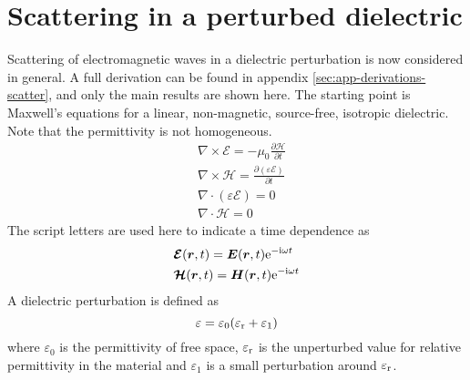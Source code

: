 \documentclass[11pt,twoside]{eitExjobb}
\begin{document}
	\section{Scattering in a perturbed dielectric \label{sec:analytical-scatter}}
	Scattering of electromagnetic waves in a dielectric perturbation is now considered in general. A full derivation can be found in appendix \ref{sec:app-derivations-scatter}, and only the main results are shown here. The starting point is Maxwell's equations for a linear, non-magnetic, source-free, isotropic dielectric. Note that the permittivity is not homogeneous.
	\begin{align*}
		&\nabla \times \bm{\mathcal{E}} = -\mu_0 \frac{\partial \bm{\mathcal{H}}}{\partial t} \\
		&\nabla \times \bm{\mathcal{H}} = \frac{\partial (\varepsilon \bm{\mathcal{E}})}{\partial t} \\
		&\nabla \cdot (\varepsilon \bm{\mathcal{E}}) = 0 \\
		&\nabla \cdot \bm{\mathcal{H}} = 0
	\end{align*}
	The script letters are used here to indicate a time dependence as
	\begin{align*}
		&\bm{\mathcal{E}}(\bm{r},t) = \bm{E}(\bm{r},t) \mathrm{e}^{-\mathrm{i}\omega t} \\
		&\bm{\mathcal{H}}(\bm{r},t) = \bm{H}(\bm{r},t) \mathrm{e}^{-\mathrm{i}\omega t}
	\end{align*}
	A dielectric perturbation is defined as
	\begin{equation*}
	\varepsilon = \varepsilon_0(\varepsilon_{\mathrm{r}} + \varepsilon_1)
	\end{equation*}
	where $\varepsilon_0$ is the permittivity of free space, $\varepsilon_{\mathrm{r}}$ is the unperturbed value for relative permittivity in the material and $\varepsilon_1$ is a small perturbation around $\varepsilon_{\mathrm{r}}$. 
	
\end{document}
